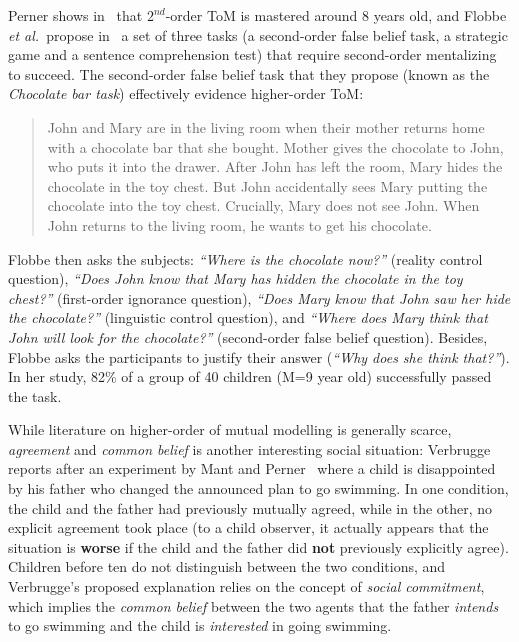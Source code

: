 \documentclass{sig-alternate}
\newcommand{\etal}{{\textit{et al.~}}}
\begin{document}
Perner shows in~\cite{perner1988higher} that $2^{nd}$-order ToM is
mastered around 8 years old, and Flobbe \etal propose
in~\cite{flobbe2008children} a set of three tasks (a second-order false belief
task, a strategic game and a sentence comprehension test) that require
second-order mentalizing to succeed. The second-order false belief task that
they propose (known as the \emph{Chocolate bar task}) effectively evidence
higher-order ToM: \begin{quote} John and Mary are in the living room when their
mother returns home with a chocolate bar that she bought. Mother gives the
chocolate to John, who puts it into the drawer. After John has left the
room, Mary hides the chocolate in the toy chest. But John accidentally sees
Mary putting the chocolate into the toy chest. Crucially, Mary does not see
John. When John returns to the living room, he wants to get his chocolate.
\end{quote}

Flobbe then asks the subjects: \emph{``Where is the chocolate now?''} (reality
control question), \emph{``Does John know that Mary has hidden the chocolate in
the toy chest?''} (first-order ignorance question), \emph{``Does Mary know that
John saw her hide the chocolate?''} (linguistic control question), and
\emph{``Where does Mary think that John will look for the chocolate?''}
(second-order false belief question). Besides, Flobbe asks the participants to
justify their answer (\emph{``Why does she think that?''}). In her study, 82\%
of a group of 40 children (M=9 year old) successfully passed the task.

While literature on higher-order of mutual modelling is generally scarce, \emph{agreement}
and \emph{common belief} is another interesting social situation:
Verbrugge~\cite[p.~664]{verbrugge2009logic} reports after an experiment by Mant
and Perner~\cite{mant1988child} where a child is disappointed by his father who
changed the announced plan to go swimming. In one condition, the child and the
father had previously mutually agreed, while in the other, no explicit agreement
took place (to a child observer, it actually appears that the situation is
\textbf{worse} if the child and the father did \textbf{not} previously
explicitly agree). Children before ten do not
distinguish between the two conditions, and Verbrugge's proposed explanation
relies on the concept of \emph{social commitment}, which implies
the \emph{common belief} between the two agents that the father \emph{intends} to
go swimming and the child is \emph{interested} in going swimming.
\end{document}
